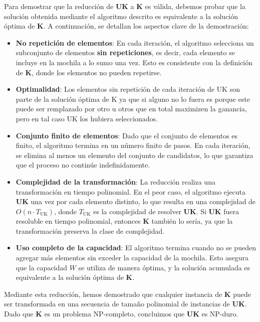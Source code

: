 \documentclass{report}
\begin{document}
Para demostrar que la reducción de \textbf{UK} a \textbf{K} es válida, debemos probar que la solución obtenida mediante el algoritmo descrito es equivalente a la solución óptima de \textbf{K}. A continuación, se detallan los aspectos clave de la demostración:

\begin{itemize}
	\item \textbf{No repetición de elementos}: En cada iteración, el algoritmo selecciona un subconjunto de elementos \textbf{sin repeticiones}, es decir, cada elemento se incluye en la mochila a lo sumo una vez. Esto es consistente con la definición de \textbf{K}, donde los elementos no pueden repetirse.
	
	\item \textbf{Optimalidad}: Los elementos sin repetición de cada iteración de UK son parte de la solución óptima de K ya que si alguno no lo fuera es porque este puede ser remplazado por otro u otros que en total maximizen la ganancia, pero en tal caso UK los hubiera seleccionados.
	
	\item \textbf{Conjunto finito de elementos}: Dado que el conjunto de elementos es finito, el algoritmo termina en un número finito de pasos. En cada iteración, se elimina al menos un elemento del conjunto de candidatos, lo que garantiza que el proceso no continúe indefinidamente.
	
	\item \textbf{Complejidad de la transformación}: La reducción realiza una transformación en tiempo polinomial. En el peor caso, el algoritmo ejecuta \textbf{UK} una vez por cada elemento distinto, lo que resulta en una complejidad de \( O(n \cdot T_{\text{UK}}) \), donde \( T_{\text{UK}} \) es la complejidad de resolver \textbf{UK}. Si \textbf{UK} fuera resoluble en tiempo polinomial, entonces \textbf{K} también lo sería, ya que la transformación preserva la clase de complejidad.
	
	\item \textbf{Uso completo de la capacidad}: El algoritmo termina cuando no se pueden agregar más elementos sin exceder la capacidad de la mochila. Esto asegura que la capacidad \( W \) se utiliza de manera óptima, y la solución acumulada es equivalente a la solución óptima de \textbf{K}.
\end{itemize}
Mediante esta reducción, hemos demostrado que cualquier instancia de \textbf{K} puede ser transformada en una secuencia de tamaño polinomial de instancias de \textbf{UK}. Dado que \textbf{K} es un problema NP-completo, concluimos que \textbf{UK} es NP-duro.
\end{document}

